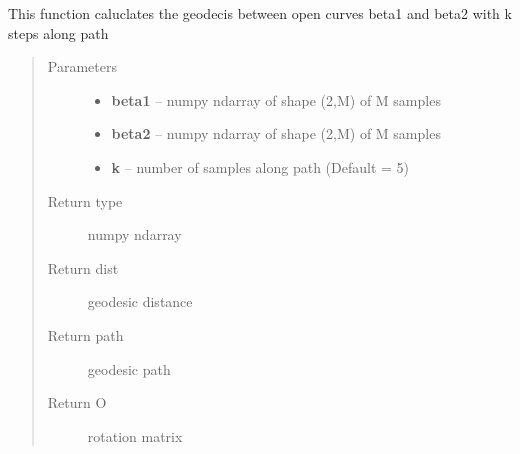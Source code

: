 \documentclass[letterpaper,10pt,english]{sphinxmanual}
\begin{document}

\begin{fulllineitems}
\label{geodesic:geodesic.geod_sphere}
This function caluclates the geodecis between open curves beta1 and
beta2 with k steps along path
\begin{quote}\begin{description}
\item[{Parameters}] \leavevmode\begin{itemize}
\item {} 
\textbf{beta1} -- numpy ndarray of shape (2,M) of M samples

\item {} 
\textbf{beta2} -- numpy ndarray of shape (2,M) of M samples

\item {} 
\textbf{k} -- number of samples along path (Default = 5)

\end{itemize}

\item[{Return type}] \leavevmode
numpy ndarray

\item[{Return dist}] \leavevmode
geodesic distance

\item[{Return path}] \leavevmode
geodesic path

\item[{Return O}] \leavevmode
rotation matrix

\end{description}\end{quote}

\end{fulllineitems}

\end{document}
